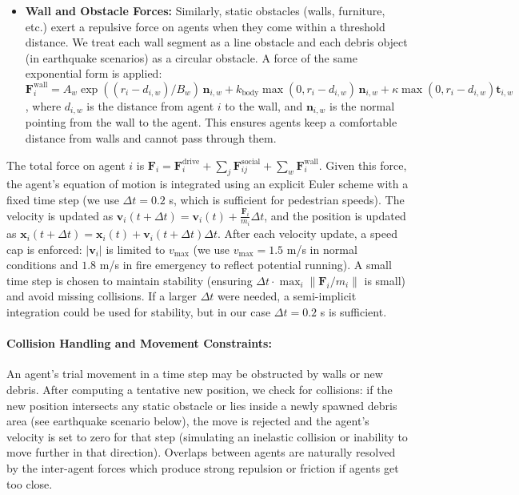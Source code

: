 \documentclass[11pt,a4paper]{article}
\begin{document}
\begin{itemize}
    \item \textbf{Wall and Obstacle Forces:} Similarly, static obstacles (walls, furniture, etc.) exert a repulsive force on agents when they come within a threshold distance. We treat each wall segment as a line obstacle and each debris object (in earthquake scenarios) as a circular obstacle. A force of the same exponential form is applied: $\mathbf{F}_{i}^{\text{wall}} = A_w \exp((r_i - d_{i,w})/B_w)\,\mathbf{n}_{i,w} + k_{\text{body}}\max(0, r_i - d_{i,w})\,\mathbf{n}_{i,w} + \kappa\max(0, r_i - d_{i,w}) \mathbf{t}_{i,w}$, where $d_{i,w}$ is the distance from agent $i$ to the wall, and $\mathbf{n}_{i,w}$ is the normal pointing from the wall to the agent. This ensures agents keep a comfortable distance from walls and cannot pass through them.
\end{itemize}
The total force on agent $i$ is $\mathbf{F}_i = \mathbf{F}_i^{\text{drive}} + \sum_{j}\mathbf{F}_{ij}^{\text{social}} + \sum_{w}\mathbf{F}_{i}^{\text{wall}}$. Given this force, the agent's equation of motion is integrated using an explicit Euler scheme with a fixed time step (we use $\Delta t = 0.2$ s, which is sufficient for pedestrian speeds). The velocity is updated as $\mathbf{v}_i(t+\Delta t) = \mathbf{v}_i(t) + \frac{\mathbf{F}_i}{m_i}\Delta t$, and the position is updated as $\mathbf{x}_i(t+\Delta t) = \mathbf{x}_i(t) + \mathbf{v}_i(t+\Delta t)\Delta t$. After each velocity update, a speed cap is enforced: $|\mathbf{v}_i|$ is limited to $v_{\max}$ (we use $v_{\max}=1.5$ m/s in normal conditions and $1.8$ m/s in fire emergency to reflect potential running). A small time step is chosen to maintain stability (ensuring $\Delta t \cdot \max_i\|\mathbf{F}_i/m_i\|$ is small) and avoid missing collisions. If a larger $\Delta t$ were needed, a semi-implicit integration could be used for stability, but in our case $\Delta t=0.2$ s is sufficient.

\paragraph{Collision Handling and Movement Constraints:} An agent's trial movement in a time step may be obstructed by walls or new debris. After computing a tentative new position, we check for collisions: if the new position intersects any static obstacle or lies inside a newly spawned debris area (see earthquake scenario below), the move is rejected and the agent's velocity is set to zero for that step (simulating an inelastic collision or inability to move further in that direction). Overlaps between agents are naturally resolved by the inter-agent forces which produce strong repulsion or friction if agents get too close. 
\end{document}
